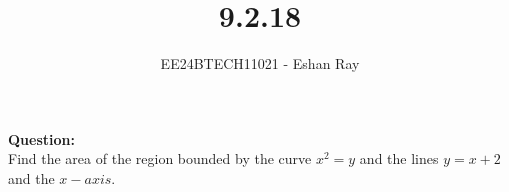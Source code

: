 \documentclass[journal]{IEEEtran}
\begin{document}

\vspace{3cm}

\title{9.2.18}
\author{EE24BTECH11021 - Eshan Ray}

{\let\newpage\relax\maketitle}

\renewcommand{\thefigure}{\theenumi}
\renewcommand{\thetable}{\theenumi}
\setlength{\intextsep}{10pt} %




\textbf{Question: }\\
Find the area of the region bounded by the curve $x^2 = y$ and the lines $y =x  + 2$ and
the $x-axis$.\\
\end{document}
